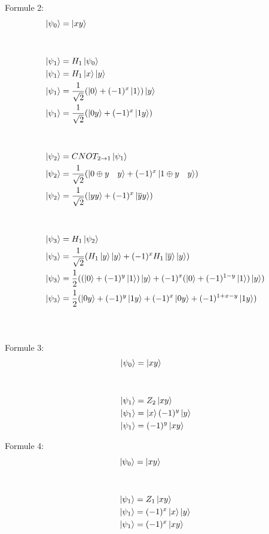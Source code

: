 \documentclass{article}
\begin{document}
Formule 2:
\begin{align*}
    \ket{\psi_0} &= \ket{xy} \\ \\ \\
    \ket{\psi_1} &= H_1\ket{\psi_0} \\
    \ket{\psi_1} &= H_1\ket{x} \ket{y} \\
    \ket{\psi_1} &= \frac{1}{\sqrt{2}}(\ket{0} + (-1)^x\ket{1})\ket{y} \\
    \ket{\psi_1} &= \frac{1}{\sqrt{2}}(\ket{0y} + (-1)^x\ket{1y}) \\ \\ \\
    \ket{\psi_2} &= CNOT_{2\rightarrow1}\ket{\psi_1} \\
    \ket{\psi_2} &= \frac{1}{\sqrt{2}}(\ket{0 \oplus y \quad y} + (-1)^x\ket{1 \oplus y \quad y}) \\
    \ket{\psi_2} &= \frac{1}{\sqrt{2}}(\ket{y y} + (-1)^x\ket{\overline{y} y}) \\ \\ \\
    \ket{\psi_3} &= H_1\ket{\psi_2} \\
    \ket{\psi_3} &= \frac{1}{\sqrt{2}}(H_1\ket{y}\ket{y} + (-1)^x H_1\ket{\overline{y}}\ket{y}) \\
    \ket{\psi_3} &= \frac{1}{2}((\ket{0} + (-1)^y\ket{1})\ket{y} + (-1)^x(\ket{0} + (-1)^{1-y}\ket{1})\ket{y}) \\
    \ket{\psi_3} &= \frac{1}{2}(\ket{0y} + (-1)^y\ket{1y} + (-1)^x\ket{0y} + (-1)^{1+x-y}\ket{1y}) \\ \\ \\
\end{align*}

Formule 3:
\begin{align*}
    \ket{\psi_0} &= \ket{xy} \\ \\ \\
    \ket{\psi_1} &= Z_2\ket{xy} \\
    \ket{\psi_1} &= \ket{x} (-1)^y\ket{y} \\
    \ket{\psi_1} &= (-1)^y\ket{xy}
\end{align*}

Formule 4:
\begin{align*}
    \ket{\psi_0} &= \ket{xy} \\ \\ \\
    \ket{\psi_1} &= Z_1\ket{xy} \\
    \ket{\psi_1} &= (-1)^x\ket{x}\ket{y} \\
    \ket{\psi_1} &= (-1)^x\ket{xy} \\
\end{align*}
\end{document}
